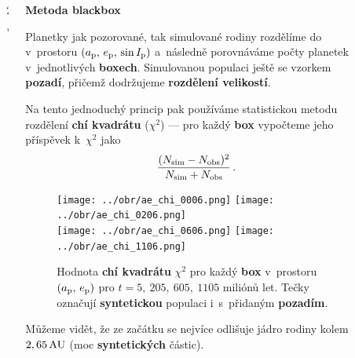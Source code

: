 \documentclass{beamer}
\newlength{\sep}
\newlength{\vyska}
\newlength{\vyskaB}
\newlength{\vyskaC}
\newlength{\side}
\newlength{\main}
\newlength{\newparskip}
\begin{document}
\begin{frame}
\begin{columns}[t]
\begin{column}{\main}
\begin{tcolorbox}[title=Simulace orbitálního vývoje\phantom{Úy},height=0.75\vyskaB]
\begin{figure}
		\label{fig:ae_chi2}
	\end{figure}

\vspace{1.5cm}

\end{tcolorbox}
\vspace{\sep}
\end{column}

\begin{column}{2\sep}
\end{column}

\begin{column}{\side}
\begin{tcolorbox}[title=Stáří rodiny Eunomia\phantom{Úy},height=0.75\vyskaC]
{\centering \large \bfseries Metoda blackbox} \cite{broz19} \\[6pt]

{\small Planetky jak pozorované, tak simulované rodiny rozdělíme do  v~prostoru $(a_{\rm p},\,e_{\rm p},\,\sin I_{\rm p})$ a~následně porovnáváme počty planetek v~jednotlivých \textbf{boxech}. Simulovanou populaci ještě  se vzorkem \textbf{pozadí}, přičemž dodržujeme \textbf{rozdělení velikostí}. 

Na tento jednoduchý princip pak používáme statistickou metodu rozdělení \textbf{chí kvadrátu} ($\chi^2$) --- pro každý \textbf{box} vypočteme jeho příspěvek k~$\chi^2$ jako
\begin{align*}
	\frac{(N_{\rm sim}-N_{\rm obs})^2}{N_{\rm sim}+N_{\rm obs}}\,.
\end{align*}
}

	\begin{figure}
	\centering
	\texttt{[image: ../obr/ae\_chi\_0006.png]}
	\texttt{[image: ../obr/ae\_chi\_0206.png]}\\
	\texttt{[image: ../obr/ae\_chi\_0606.png]}
	\texttt{[image: ../obr/ae\_chi\_1106.png]}
	\captionsetup{width=.8\linewidth}
	\caption{Hodnota \textbf{chí kvadrátu} $\chi^2$ pro každý \textbf{box} v~prostoru $(a_{\rm p},\,e_{\rm p})$ pro $t=5,\ 205,\ 605,\ 1105$ miliónů let. Tečky označují \textbf{syntetickou} populaci i~s~přidaným \textbf{pozadím}.} 
	\label{fig:ae_chi2}
	\end{figure}

Můžeme vidět, že ze začátku se nejvíce odlišuje jádro rodiny kolem $2,65\,{\rm AU}$ (moc \textbf{syntetických} částic).\\[\newparskip]   


\end{tcolorbox}
\end{column}
\end{columns}
\end{frame}
\end{document}
